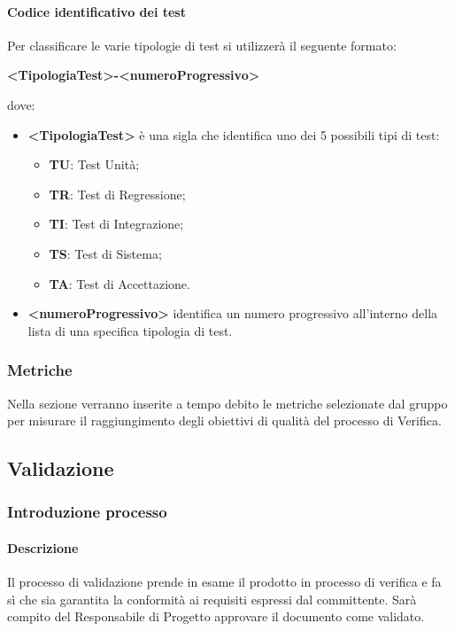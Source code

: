                 \paragraph{Codice identificativo dei test}
                    Per classificare le varie tipologie di test si utilizzerà il seguente formato:
                    \begin{center}
                        \textbf{<TipologiaTest>-<numeroProgressivo>}
                    \end{center}
                    dove:
                    \begin{itemize}
                        \item\textbf{<TipologiaTest> } è una sigla che identifica uno dei 5 possibili tipi di test:
                            \begin{itemize}
                                \item\textbf{TU}: Test Unità;
                                \item\textbf{TR}: Test di Regressione;
                                \item\textbf{TI}: Test di Integrazione;
                                \item\textbf{TS}: Test di Sistema;
                                \item\textbf{TA}: Test di Accettazione.
                            \end{itemize}
                        \item\textbf{<numeroProgressivo>} identifica un numero progressivo all’interno della lista di una specifica tipologia di test.
                    \end{itemize}
        \subsubsection{Metriche}
            Nella sezione verranno inserite a tempo debito le metriche selezionate dal gruppo per misurare il raggiungimento degli obiettivi di qualità del processo di Verifica.

    \subsection{Validazione}
        \subsubsection{Introduzione processo}
            \paragraph{Descrizione}
                Il processo di validazione prende in esame il prodotto in processo di verifica e fa sì che sia garantita la conformità ai requisiti espressi dal committente. Sarà compito del Responsabile di Progetto approvare il documento come validato.

